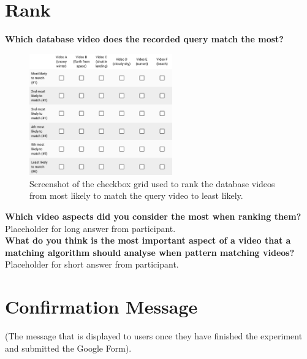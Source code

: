 \section{Rank}

\textbf{Which database video does the recorded query match the most?}\\

\begin{figure}[h] 
\centerline{\includegraphics[width=0.55\textwidth]{figures/appendix/survey_video_ranking.png}}
\caption{\label{fig:appendix_survey_video_ranking}Screenshot of the checkbox grid used to rank the database videos from most likely to match the query video to least likely.}
\end{figure}

\textbf{Which video aspects did you consider the most when ranking them?}\\

Placeholder for long answer from participant.\\

\textbf{What do you think is the most important aspect of a video that a matching algorithm should analyse when pattern matching videos?}\\

Placeholder for short answer from participant.

\section{Confirmation Message}

(The message that is displayed to users once they have finished the experiment and submitted the Google Form).\\

